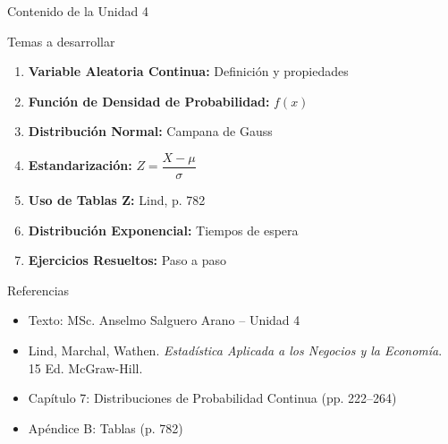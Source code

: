 \documentclass[10pt]{beamer}
\begin{document}
\begin{frame}{Contenido de la Unidad 4}
\begin{block}{Temas a desarrollar}
\begin{enumerate}
  \item \textbf{Variable Aleatoria Continua:} Definición y propiedades
  \item \textbf{Función de Densidad de Probabilidad:} $f(x)$
  \item \textbf{Distribución Normal:} Campana de Gauss
  \item \textbf{Estandarización:} $Z = \dfrac{X - \mu}{\sigma}$
  \item \textbf{Uso de Tablas Z:} Lind, p. 782
  \item \textbf{Distribución Exponencial:} Tiempos de espera
  \item \textbf{Ejercicios Resueltos:} Paso a paso
\end{enumerate}
\end{block}

\begin{exampleblock}{Referencias}
\begin{itemize}
  \item Texto: MSc. Anselmo Salguero Arano -- Unidad 4
  \item Lind, Marchal, Wathen. \textit{Estadística Aplicada a los Negocios y la Economía}. 15 Ed. McGraw-Hill.
  \item Capítulo 7: Distribuciones de Probabilidad Continua (pp. 222--264)
  \item Apéndice B: Tablas (p. 782)
\end{itemize}
\end{exampleblock}
\end{frame}
\end{document}

